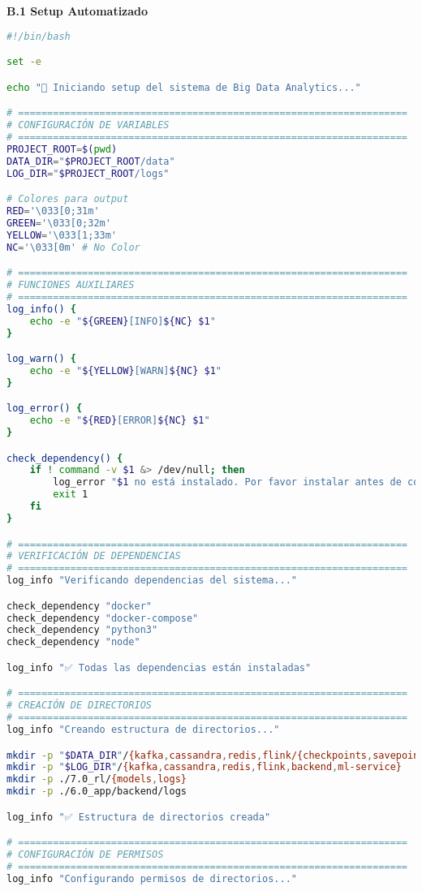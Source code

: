 \textbf{B.1 Setup Automatizado}
\begin{lstlisting}[language=bash, caption=Script de Setup Automatizado del Sistema, label=lst:setup_script]
#!/bin/bash

set -e

echo "🚀 Iniciando setup del sistema de Big Data Analytics..."

# ===================================================================
# CONFIGURACIÓN DE VARIABLES
# ===================================================================
PROJECT_ROOT=$(pwd)
DATA_DIR="$PROJECT_ROOT/data"
LOG_DIR="$PROJECT_ROOT/logs"

# Colores para output
RED='\033[0;31m'
GREEN='\033[0;32m'
YELLOW='\033[1;33m'
NC='\033[0m' # No Color

# ===================================================================
# FUNCIONES AUXILIARES
# ===================================================================
log_info() {
    echo -e "${GREEN}[INFO]${NC} $1"
}

log_warn() {
    echo -e "${YELLOW}[WARN]${NC} $1"
}

log_error() {
    echo -e "${RED}[ERROR]${NC} $1"
}

check_dependency() {
    if ! command -v $1 &> /dev/null; then
        log_error "$1 no está instalado. Por favor instalar antes de continuar."
        exit 1
    fi
}

# ===================================================================
# VERIFICACIÓN DE DEPENDENCIAS
# ===================================================================
log_info "Verificando dependencias del sistema..."

check_dependency "docker"
check_dependency "docker-compose"
check_dependency "python3"
check_dependency "node"

log_info "✅ Todas las dependencias están instaladas"

# ===================================================================
# CREACIÓN DE DIRECTORIOS
# ===================================================================
log_info "Creando estructura de directorios..."

mkdir -p "$DATA_DIR"/{kafka,cassandra,redis,flink/{checkpoints,savepoints},zookeeper}
mkdir -p "$LOG_DIR"/{kafka,cassandra,redis,flink,backend,ml-service}
mkdir -p ./7.0_rl/{models,logs}
mkdir -p ./6.0_app/backend/logs

log_info "✅ Estructura de directorios creada"

# ===================================================================
# CONFIGURACIÓN DE PERMISOS
# ===================================================================
log_info "Configurando permisos de directorios..."


\end{lstlisting}
